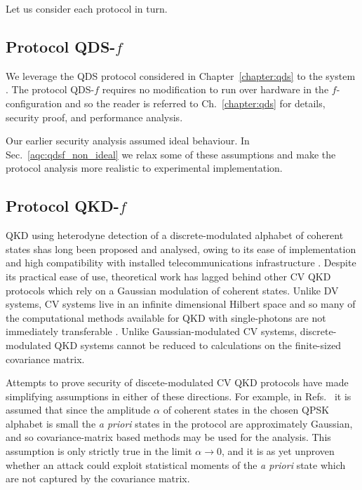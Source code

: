 Let us consider each protocol in turn.

\subsection{Protocol QDS-$f$}
We leverage the QDS protocol considered in Chapter~\ref{chapter:qds} to the system \systemF. The protocol QDS-$f$ requires no modification to run over hardware in the $f$-configuration and so the reader is referred to Ch.~\ref{chapter:qds} for details, security proof, and performance analysis.

Our earlier security analysis assumed ideal behaviour. In Sec.~\ref{aqc:qdsf_non_ideal} we relax some of these assumptions and make the protocol analysis more realistic to experimental implementation.


\subsection{Protocol QKD-$f$}
QKD using heterodyne detection of a discrete-modulated alphabet of coherent states shas long been proposed and analysed, owing to its ease of implementation and high compatibility with installed telecommunications infrastructure \cite{Leverrier2011a, Papanastasiou2018, Zhao2009, Bradler2017, Ghorai2019, Lin2019}.%
Despite its practical ease of use, theoretical work has lagged behind other CV QKD protocols which rely on a Gaussian modulation of coherent states. Unlike DV systems, CV systems live in an infinite dimensional Hilbert space and so many of the computational methods available for QKD with single-photons are not immediately transferable \cite{Tomamichel2012}. Unlike Gaussian-modulated CV systems, discrete-modulated QKD systems cannot be reduced to calculations on the finite-sized covariance matrix. 

Attempts to prove security of discete-modulated CV QKD protocols have made simplifying assumptions in either of these directions. For example, in Refs.~\cite{Leverrier2011a, Ghorai2019, Lin2019} it is assumed that since the amplitude $\alpha$ of coherent states in the chosen QPSK alphabet is small the \emph{a priori} states in the protocol are approximately Gaussian, and so covariance-matrix based methods may be used for the analysis. This assumption is only strictly true in the limit $\alpha \rightarrow 0$, and it is as yet unproven whether an attack could exploit statistical moments of the \emph{a priori} state which are not captured by the covariance matrix.

